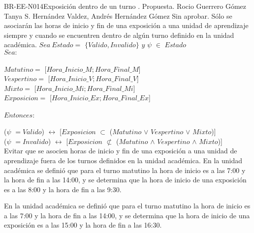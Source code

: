 \begin{BusinessRule}{BR-EE-N014}{Exposición dentro de un turno}
	{\bcCondition}    %
	{\btEnabler}     %
	{\blControlling}    %
	.
	\BRItem[Estado] Propuesta.
	 Rocio Guerrero Gómez
	 Tanya S. Hernández Valdez, Andrés Hernández Gómez
	 Sin aprobar.
	\BRItem[Descripción] Sólo se asociarán las horas de inicio y fin de una exposición a una unidad de aprendizaje siempre y cuando se encuentren dentro de algún turno definido en la unidad académica.
	\BRItem[Sentencia]  $Sea\ Estado =$ $\{Valido, Invalido\}$ $y$ $\psi$ $\in$ $Estado$ \\
	$Sea:$ \\\\ $Matutino =$ [$Hora\_Inicio\_M; Hora\_Final\_M$] \\
	$Vespertino =$ [$Hora\_Inicio\_V; Hora\_Final\_V$] \\
	$Mixto =$ [$Hora\_Inicio\_Mi; Hora\_Final\_Mi$] \\
	$Exposicion =$ [$Hora\_Inicio\_Ex; Hora\_Final\_Ex$] \\\\
	$Entonces:$ \\\\
	($\psi$ $= Valido$) $\longleftrightarrow$ [$Exposicion$ $\subset$ ($Matutino$ $\vee$ $Vespertino$ $\vee$ $Mixto$)] \\
	($\psi$ $= Invalido$) $\longleftrightarrow$ [$Exposicion$ $\nsubset$ ($Matutino$ $\wedge$ $Vespertino$ $\wedge$ $Mixto$)] \\
	\BRItem[Motivación] Evitar que se asocien horas de inicio y fin de una exposición a una unidad de aprendizaje fuera de los turnos definidos en la unidad académica.
		 \cdtEmpty
			En la unidad académica se definió que para el turno matutino la hora de inicio es a las 7:00 y la hora de fin a las 14:00, y se determina que la hora de inicio de una exposición es a las 8:00 y la hora de fin a las 9:30.
	
			En la unidad académica se definió que para el turno matutino la hora de inicio es a las 7:00 y la hora de fin a las 14:00, y se determina que la hora de inicio de una exposición es a las 15:00 y la hora de fin a las 16:30.
\end{BusinessRule}

